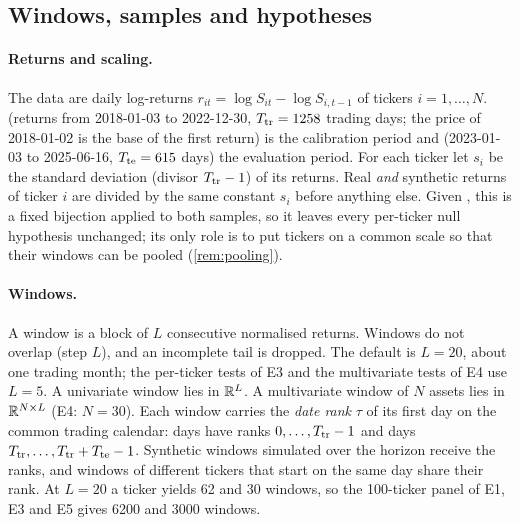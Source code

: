 \subsection{Windows, samples and hypotheses}\label{sec:method-setup}

\paragraph{Returns and scaling.}
The data are daily log-returns $r_{it}=\log S_{it}-\log S_{i,t-1}$ of tickers $i=1,\dots,N$.
\TRAIN{} (returns from 2018-01-03 to 2022-12-30, $T_{\mathrm{tr}}=1258$ trading days; the price of
2018-01-02 is the base of the first return) is the calibration period and \TEST{} (2023-01-03 to
2025-06-16, $T_{\mathrm{te}}=615$ days) the evaluation period. For each ticker let
$s_i$ be the standard deviation (divisor $T_{\mathrm{tr}}-1$) of its \TRAIN{} returns. Real \emph{and}
synthetic returns of ticker $i$ are divided by the same constant $s_i$ before anything else.
Given \TRAIN{}, this is a fixed bijection applied to both samples, so it leaves every per-ticker
null hypothesis unchanged; its only role is to put tickers on a common scale so that their
windows can be pooled (\cref{rem:pooling}).

\paragraph{Windows.}
A window is a block of $L$ consecutive normalised returns. Windows do not overlap (step $L$),
and an incomplete tail is dropped. The default is $L=20$, about one trading month; the
per-ticker tests of E3 and the multivariate tests of E4 use $L=5$. A univariate window lies in
$\mathbb{R}^{L}$. A multivariate window of $N$ assets lies in $\mathbb{R}^{N\times L}$ (E4: $N=30$). Each window
carries the \emph{date rank} $\tau$ of its first day on the common trading calendar: \TRAIN{}
days have ranks $0,\dots,T_{\mathrm{tr}}-1$ and \TEST{} days $T_{\mathrm{tr}},\dots,T_{\mathrm{tr}}+T_{\mathrm{te}}-1$. Synthetic windows
simulated over the \TEST{} horizon receive the \TEST{} ranks, and windows of different tickers
that start on the same day share their rank. At $L=20$ a ticker yields 62 \TRAIN{} and 30
\TEST{} windows, so the 100-ticker panel of E1, E3 and E5 gives 6200 and 3000 windows.

